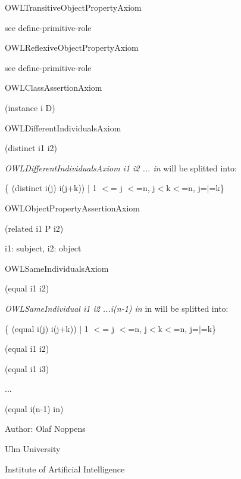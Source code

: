 O\-W\-L\-Transitive\-Object\-Property\-Axiom 

see define-\/primitive-\/role  

O\-W\-L\-Reflexive\-Object\-Property\-Axiom 

see define-\/primitive-\/role  

O\-W\-L\-Class\-Assertion\-Axiom 

(instance i D)   

O\-W\-L\-Different\-Individuals\-Axiom 

(distinct i1 i2) 

{\itshape O\-W\-L\-Different\-Individuals\-Axiom i1 i2 ... in} will be splitted into\-:\par
 \{ (distinct i(j) i(j+k)) $|$ 1 $<$= j $<$=n, j$<$k$<$=n, j=$|$=k\} \par
   

O\-W\-L\-Object\-Property\-Assertion\-Axiom 

(related i1 P i2) 

i1\-: subject, i2\-: object  

O\-W\-L\-Same\-Individuals\-Axiom 

(equal i1 i2) 

{\itshape O\-W\-L\-Same\-Individual i1 i2 ...i(n-\/1) in} in will be splitted into\-:\par
 \{ (equal i(j) i(j+k)) $|$ 1 $<$= j $<$=n, j$<$k$<$=n, j=$|$=k\} \par
 (equal i1 i2)\par
 (equal i1 i3)\par
 ...\par
 (equal i(n-\/1) in)   

Author\-: Olaf Noppens\par
 Ulm University\par
 Institute of Artificial Intelligence\par
 

